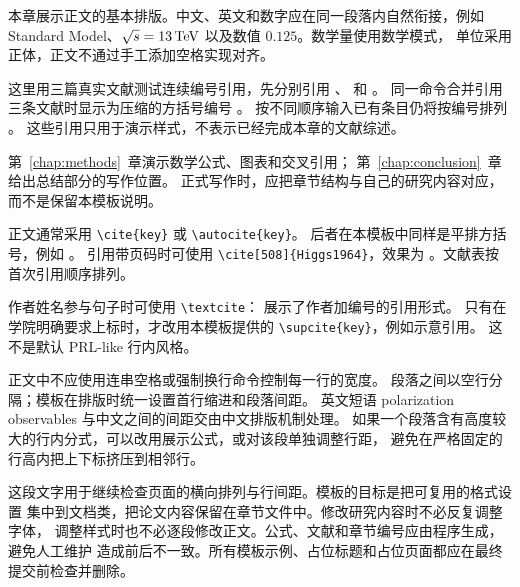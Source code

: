 \label{chap:intro}
本章展示正文的基本排版。中文、英文和数字应在同一段落内自然衔接，例如
Standard Model、$\sqrt{s}=13\,\mathrm{TeV}$ 以及数值 $0.125$。数学量使用数学模式，
单位采用正体，正文不通过手工添加空格实现对齐。

这里用三篇真实文献测试连续编号引用，先分别引用
\cite{Higgs1964}、\cite{Englert1964} 和 \cite{Weinberg1967}。
同一命令合并引用三条文献时显示为压缩的方括号编号
\cite{Higgs1964,Englert1964,Weinberg1967}。
按不同顺序输入已有条目仍将按编号排列
\cite{Weinberg1967,Higgs1964,Englert1964}。
这些引用只用于演示样式，不表示已经完成本章的文献综述。

第~\ref{chap:methods}~章演示数学公式、图表和交叉引用；
第~\ref{chap:conclusion}~章给出总结部分的写作位置。
正式写作时，应把章节结构与自己的研究内容对应，而不是保留本模板说明。

正文通常采用 \verb|\cite{key}| 或 \verb|\autocite{key}|。
后者在本模板中同样是平排方括号，例如 \autocite{Higgs1964}。
引用带页码时可使用 \verb|\cite[508]{Higgs1964}|，效果为
\cite[508]{Higgs1964}。文献表按首次引用顺序排列。

作者姓名参与句子时可使用 \verb|\textcite|：
\textcite{Weinberg1967} 展示了作者加编号的引用形式。
只有在学院明确要求上标时，才改用本模板提供的
\verb|\supcite{key}|，例如示意引用。
这不是默认 PRL-like 行内风格。

正文中不应使用连串空格或强制换行命令控制每一行的宽度。
段落之间以空行分隔；模板在排版时统一设置首行缩进和段落间距。
英文短语 polarization observables 与中文之间的间距交由中文排版机制处理。
如果一个段落含有高度较大的行内分式，可以改用展示公式，或对该段单独调整行距，
避免在严格固定的行高内把上下标挤压到相邻行。

这段文字用于继续检查页面的横向排列与行间距。模板的目标是把可复用的格式设置
集中到文档类，把论文内容保留在章节文件中。修改研究内容时不必反复调整字体，
调整样式时也不必逐段修改正文。公式、文献和章节编号应由程序生成，避免人工维护
造成前后不一致。所有模板示例、占位标题和占位页面都应在最终提交前检查并删除。
